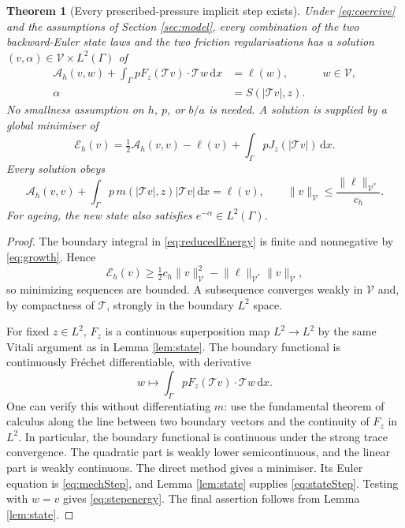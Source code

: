 \documentclass[11pt,a4paper]{article}
\newtheorem{theorem}{Theorem}[section]
\theoremstyle{definition}\newtheorem{definition}[theorem]{Definition}
\theoremstyle{remark}\newtheorem{remark}[theorem]{Remark}
\newcommand{\dd}{\,\mathrm d}
\newcommand{\norm}[1]{\lVert #1\rVert}
\newcommand{\A}{\mathcal A}
\newcommand{\E}{\mathcal E}
\newcommand{\V}{\mathcal V}
\newcommand{\tr}{\mathcal T}
\numberwithin{equation}{section}
\begin{document}
\begin{theorem}[Every prescribed-pressure implicit step exists]\label{thm:existence}
Under \eqref{eq:coercive} and the assumptions of Section \ref{sec:model}, every combination of the two backward-Euler state laws and the two friction regularisations has a solution $(v,\alpha)\in\V\times L^2(\Gamma)$ of
\begin{align}
 \A_h(v,w)+\int_\Gamma p F_z(\tr v)\cdot\tr w\dd x&=\ell(w),
                  &&w\in\V,\label{eq:mechStep}\\
 \alpha&=S(|\tr v|,z).\label{eq:stateStep}
\end{align}
No smallness assumption on $h$, $p$, or $b/a$ is needed. A solution is supplied by a global minimiser of
\begin{equation}\label{eq:reducedEnergy}
 \E_h(v)=\tfrac12\A_h(v,v)-\ell(v)
                  +\int_\Gamma p J_z(|\tr v|)\dd x.
\end{equation}
Every solution obeys
\begin{equation}\label{eq:stepenergy}
 \A_h(v,v)+\int_\Gamma p\,m(|\tr v|,z)|\tr v|\dd x=\ell(v),
 \qquad \norm v_\V\le\frac{\norm\ell_{\V^*}}{c_h}.
\end{equation}
For ageing, the new state also satisfies $e^{-\alpha}\in L^2(\Gamma)$.
\end{theorem}
\begin{proof}
The boundary integral in \eqref{eq:reducedEnergy} is finite and nonnegative by \eqref{eq:growth}. Hence
\[
 \E_h(v)\ge\tfrac12c_h\norm v_\V^2-\norm\ell_{\V^*}\norm v_\V,
\]
so minimizing sequences are bounded. A subsequence converges weakly in $\V$ and, by compactness of $\tr$, strongly in the boundary $L^2$ space.

For fixed $z\in L^2$, $F_z$ is a continuous superposition map $L^2\to L^2$ by the same Vitali argument as in Lemma \ref{lem:state}. The boundary functional is continuously Fr\'echet differentiable, with derivative
\[
 w\longmapsto\int_\Gamma p F_z(\tr v)\cdot\tr w\dd x.
\]
One can verify this without differentiating $m$: use the fundamental theorem of calculus along the line between two boundary vectors and the continuity of $F_z$ in $L^2$. In particular, the boundary functional is continuous under the strong trace convergence. The quadratic part is weakly lower semicontinuous, and the linear part is weakly continuous. The direct method gives a minimiser. Its Euler equation is \eqref{eq:mechStep}, and Lemma \ref{lem:state} supplies \eqref{eq:stateStep}. Testing with $w=v$ gives \eqref{eq:stepenergy}. The final assertion follows from Lemma \ref{lem:state}.
\end{proof}
\end{document}
